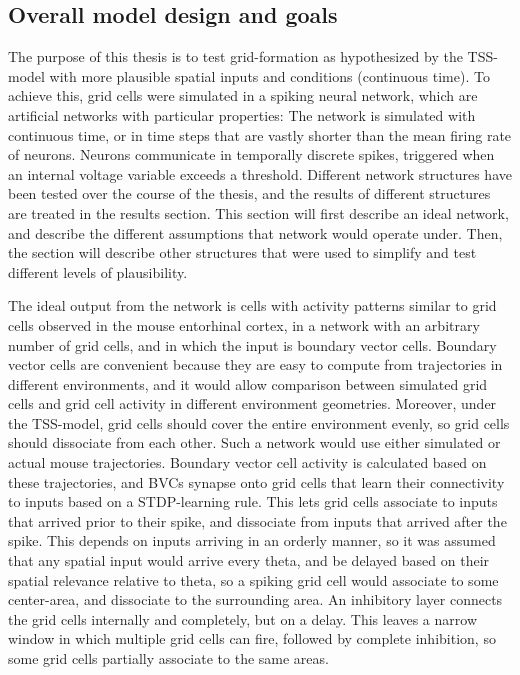 \documentclass{article}
\begin{document}
    \subsection{Overall model design and goals}The purpose of this thesis is to test grid-formation as hypothesized by the TSS-model with more plausible spatial inputs and conditions (continuous time). To achieve this, grid cells were simulated in a spiking neural network, which are artificial networks with particular properties:
    The network is simulated with continuous time, or in time steps that are vastly shorter than the mean firing rate of neurons.
    Neurons communicate in temporally discrete spikes, triggered when an internal voltage variable exceeds a threshold.
    Different network structures have been tested over the course of the thesis, and the results of different structures are treated in the results section. This section will first describe an ideal network, and describe the different assumptions that network would operate under. Then, the section will describe other structures that were used to simplify and test different levels of plausibility.

    The ideal output from the network is cells with activity patterns similar to grid cells observed in the mouse entorhinal cortex, in a network with an arbitrary number of grid cells, and in which the input is boundary vector cells. Boundary vector cells are convenient because they are easy to compute from trajectories in different environments, and it would allow comparison between simulated grid cells and grid cell activity in different environment geometries. Moreover, under the TSS-model, grid cells should cover the entire environment evenly, so grid cells should dissociate from each other.
    Such a network would use either simulated or actual mouse trajectories. Boundary vector cell activity is calculated based on these trajectories, and BVCs synapse onto grid cells that learn their connectivity to inputs based on a STDP-learning rule. This lets grid cells associate to inputs that arrived prior to their spike, and dissociate from inputs that arrived after the spike. This depends on inputs arriving in an orderly manner, so it was assumed that any spatial input would arrive every theta, and be delayed based on their spatial relevance relative to theta, so a spiking grid cell would associate to some center-area, and dissociate to the surrounding area.
    An inhibitory layer connects the grid cells internally and completely, but on a delay. This leaves a narrow window in which multiple grid cells can fire, followed by complete inhibition, so some grid cells partially associate to the same areas.
\end{document}
